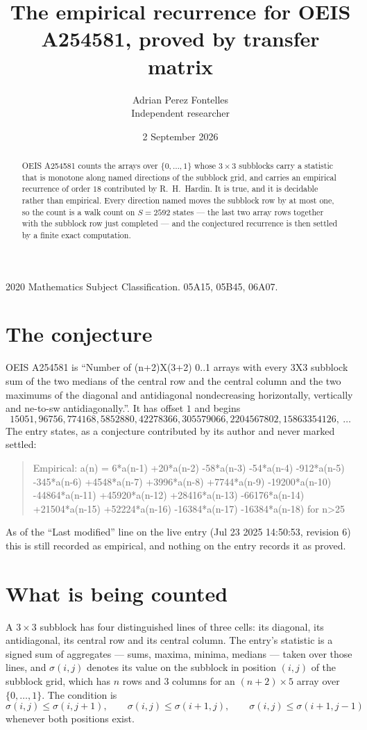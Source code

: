 \documentclass[11pt,a4paper]{article}
\title{The empirical recurrence for OEIS A254581, proved by transfer matrix}
\author{Adrian Perez Fontelles\\ \small Independent researcher}
\date{2 September 2026}
\theoremstyle{plain}
\theoremstyle{definition}
\begin{document}
\maketitle

\begin{abstract}
OEIS A254581 counts the arrays over $\{0,\dots,1\}$ whose $3\times3$ subblocks carry a
statistic that is monotone along named directions of the subblock grid, and carries an
empirical recurrence of order $18$ contributed by R.~H.~Hardin. It is true, and it is
decidable rather than empirical. Every direction named moves the subblock row by at most one,
so the count is a walk count on $S=2592$ states --- the last two array rows together with the
subblock row just completed --- and the conjectured recurrence is then settled by a finite
exact computation.
\end{abstract}

\noindent\small 2020 Mathematics Subject Classification. 05A15, 05B45, 06A07.\normalsize

\section{The conjecture}

OEIS A254581 is ``Number of (n+2)X(3+2) 0..1 arrays with every 3X3 subblock sum of the two medians of the central row and the central column and the two maximums of the diagonal and antidiagonal nondecreasing horizontally, vertically and ne-to-sw antidiagonally.''. It has offset $1$ and begins
\[
15051, 96756, 774168, 5852880, 42278366, 305579066, 2204567802, 15863354126,\ \dots
\]
The entry states, as a conjecture contributed by its author and never marked settled:
\begin{quote}
Empirical: a(n) = 6*a(n-1) +20*a(n-2) -58*a(n-3) -54*a(n-4) -912*a(n-5) -345*a(n-6) +4548*a(n-7) +3996*a(n-8) +7744*a(n-9) -19200*a(n-10) -44864*a(n-11) +45920*a(n-12) +28416*a(n-13) -66176*a(n-14) +21504*a(n-15) +52224*a(n-16) -16384*a(n-17) -16384*a(n-18) for n>25
\end{quote}
As of the ``Last modified'' line on the live entry (Jul 23 2025 14:50:53, revision 6) this is still
recorded as empirical, and nothing on the entry records it as proved.

\section{What is being counted}

A $3\times3$ subblock has four distinguished lines of three cells: its diagonal, its
antidiagonal, its central row and its central column. The entry's statistic is a signed sum of
aggregates --- sums, maxima, minima, medians --- taken over those lines, and $\sigma(i,j)$
denotes its value on the subblock in position $(i,j)$ of the subblock grid, which has $n$ rows
and $3$ columns for an $(n+2)\times5$ array over $\{0,\dots,1\}$. The condition is
\[
\sigma(i,j)\le\sigma(i,j+1),\qquad \sigma(i,j)\le\sigma(i+1,j),\qquad \sigma(i,j)\le\sigma(i+1,j-1)
\]
whenever both positions exist.
\end{document}
